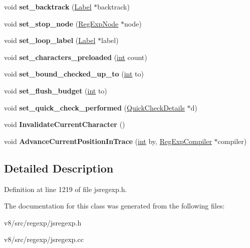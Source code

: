 \begin{DoxyCompactItemize}
void {\bfseries set\+\_\+backtrack} (\mbox{\hyperlink{classv8_1_1internal_1_1Label}{Label}} $\ast$backtrack)
\item 
\mbox{\label{classv8_1_1internal_1_1Trace_a15c4f73f8c67ffe1cc89022e77f0f08d}} 
void {\bfseries set\+\_\+stop\+\_\+node} (\mbox{\hyperlink{classv8_1_1internal_1_1RegExpNode}{Reg\+Exp\+Node}} $\ast$node)
\item 
\mbox{\label{classv8_1_1internal_1_1Trace_af1892d71317fec9d1572d586eaaa650a}} 
void {\bfseries set\+\_\+loop\+\_\+label} (\mbox{\hyperlink{classv8_1_1internal_1_1Label}{Label}} $\ast$label)
\item 
\mbox{\label{classv8_1_1internal_1_1Trace_a814b56c3489e65d99c19444307d92b4b}} 
void {\bfseries set\+\_\+characters\+\_\+preloaded} (\mbox{\hyperlink{classint}{int}} count)
\item 
\mbox{\label{classv8_1_1internal_1_1Trace_acc47ada5b60091d4cffa56843d1caa19}} 
void {\bfseries set\+\_\+bound\+\_\+checked\+\_\+up\+\_\+to} (\mbox{\hyperlink{classint}{int}} to)
\item 
\mbox{\label{classv8_1_1internal_1_1Trace_af3db12d8d1de2cab0a28f4138e6e6c9d}} 
void {\bfseries set\+\_\+flush\+\_\+budget} (\mbox{\hyperlink{classint}{int}} to)
\item 
\mbox{\label{classv8_1_1internal_1_1Trace_a9eb035553c6ae5b4998acdb6544b7976}} 
void {\bfseries set\+\_\+quick\+\_\+check\+\_\+performed} (\mbox{\hyperlink{classv8_1_1internal_1_1QuickCheckDetails}{Quick\+Check\+Details}} $\ast$d)
\item 
\mbox{\label{classv8_1_1internal_1_1Trace_afb21dd6aad6cd15722fdadf6fd58554a}} 
void {\bfseries Invalidate\+Current\+Character} ()
\item 
\mbox{\label{classv8_1_1internal_1_1Trace_a7e078348b42259aaaa38bc2a2f90d2ab}} 
void {\bfseries Advance\+Current\+Position\+In\+Trace} (\mbox{\hyperlink{classint}{int}} by, \mbox{\hyperlink{classv8_1_1internal_1_1RegExpCompiler}{Reg\+Exp\+Compiler}} $\ast$compiler)
\end{DoxyCompactItemize}


\subsection{Detailed Description}


Definition at line 1219 of file jsregexp.\+h.



The documentation for this class was generated from the following files\+:\begin{DoxyCompactItemize}
\item 
v8/src/regexp/jsregexp.\+h\item 
v8/src/regexp/jsregexp.\+cc\end{DoxyCompactItemize}
